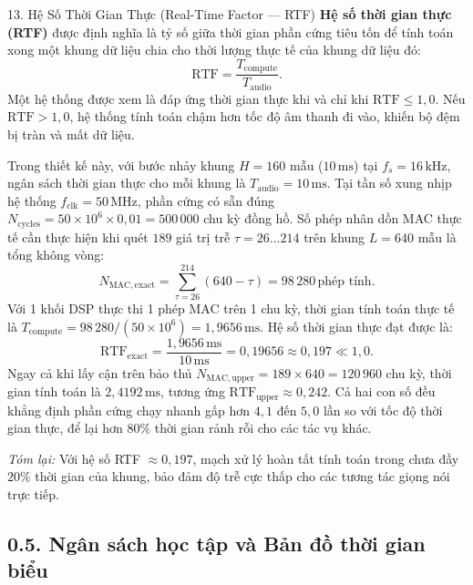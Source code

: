 \begin{feynmanbox}{13. Hệ Số Thời Gian Thực (Real-Time Factor --- RTF)}
\textbf{Hệ số thời gian thực (RTF)} được định nghĩa là tỷ số giữa thời gian phần cứng tiêu tốn để tính toán xong một khung dữ liệu chia cho thời lượng thực tế của khung dữ liệu đó:
\[
\text{RTF} = \frac{T_{\mathrm{compute}}}{T_{\mathrm{audio}}}.
\]
Một hệ thống được xem là đáp ứng thời gian thực khi và chỉ khi $\text{RTF} \le 1{,}0$. Nếu $\text{RTF} > 1{,}0$, hệ thống tính toán chậm hơn tốc độ âm thanh đi vào, khiến bộ đệm bị tràn và mất dữ liệu.

Trong thiết kế này, với bước nhảy khung $H = 160$ mẫu ($10\,\text{ms}$) tại $f_s = 16\,\text{kHz}$, ngân sách thời gian thực cho mỗi khung là $T_{\mathrm{audio}} = 10\,\text{ms}$. Tại tần số xung nhịp hệ thống $f_{\mathrm{clk}} = 50\,\text{MHz}$, phần cứng có sẵn đúng $N_{\mathrm{cycles}} = 50 \times 10^6 \times 0{,}01 = 500\,000$ chu kỳ đồng hồ. Số phép nhân dồn MAC thực tế cần thực hiện khi quét $189$ giá trị trễ $\tau = 26 \ldots 214$ trên khung $L = 640$ mẫu là tổng không vòng:
\[
N_{\mathrm{MAC,exact}} = \sum_{\tau=26}^{214} (640 - \tau) = 98\,280\,\text{phép tính}.
\]
Với 1 khối DSP thực thi 1 phép MAC trên 1 chu kỳ, thời gian tính toán thực tế là $T_{\mathrm{compute}} = 98\,280 / (50 \times 10^6) = 1{,}9656\,\text{ms}$. Hệ số thời gian thực đạt được là:
\[
\text{RTF}_{\mathrm{exact}} = \frac{1{,}9656\,\text{ms}}{10\,\text{ms}} = 0{,}19656 \approx 0{,}197 \ll 1{,}0.
\]
Ngay cả khi lấy cận trên bảo thủ $N_{\mathrm{MAC,upper}} = 189 \times 640 = 120\,960$ chu kỳ, thời gian tính toán là $2{,}4192\,\text{ms}$, tương ứng $\text{RTF}_{\mathrm{upper}} \approx 0{,}242$. Cả hai con số đều khẳng định phần cứng chạy nhanh gấp hơn $4{,}1$ đến $5{,}0$ lần so với tốc độ thời gian thực, để lại hơn $80\%$ thời gian rảnh rỗi cho các tác vụ khác.

\emph{Tóm lại:} Với hệ số RTF $\approx 0{,}197$, mạch xử lý hoàn tất tính toán trong chưa đầy $20\%$ thời gian của khung, bảo đảm độ trễ cực thấp cho các tương tác giọng nói trực tiếp.
\end{feynmanbox}

\subsection*{0.5. Ngân sách học tập và Bản đồ thời gian biểu}

